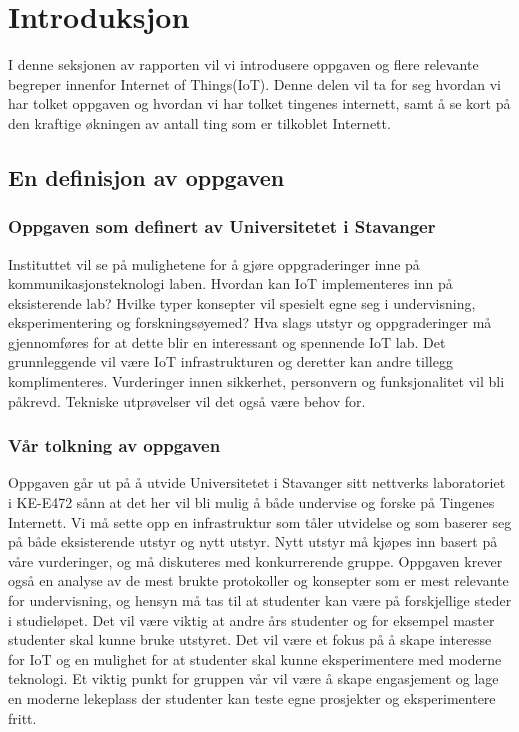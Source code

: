 \documentclass{article}
\begin{document}


\newpage
\section{Introduksjon}

I denne seksjonen av rapporten vil vi introdusere oppgaven og flere relevante begreper innenfor Internet of Things(IoT). Denne delen vil ta for seg hvordan vi har tolket oppgaven og hvordan vi har tolket tingenes internett, samt å se kort på den kraftige økningen av antall ting som er tilkoblet Internett.

\subsection{En definisjon av oppgaven}

\subsubsection{Oppgaven som definert av Universitetet i Stavanger}
Instituttet vil se på mulighetene for å gjøre oppgraderinger inne på kommunikasjonsteknologi laben. Hvordan kan IoT implementeres inn på eksisterende lab? Hvilke typer konsepter vil spesielt egne seg i undervisning, eksperimentering og forskningsøyemed? Hva slags utstyr og oppgraderinger må gjennomføres for at dette blir en interessant og spennende IoT lab. Det grunnleggende vil være IoT infrastrukturen og deretter kan andre tillegg komplimenteres. Vurderinger innen sikkerhet, personvern og funksjonalitet vil bli påkrevd. Tekniske utprøvelser vil det også være behov for.

\subsubsection{Vår tolkning av oppgaven}
Oppgaven går ut på å utvide Universitetet i Stavanger sitt nettverks laboratoriet i KE-E472 sånn at det her vil bli mulig å både undervise og forske på Tingenes Internett. Vi må sette opp en infrastruktur som tåler utvidelse og som baserer seg på  både eksisterende utstyr og nytt utstyr. Nytt utstyr må kjøpes inn basert på våre vurderinger, og må diskuteres med konkurrerende gruppe. Oppgaven krever også en analyse av de mest brukte protokoller og konsepter som er mest relevante for undervisning, og hensyn må tas til at studenter kan være på forskjellige steder i studieløpet. Det vil være viktig at andre års studenter og for eksempel master studenter skal kunne bruke utstyret. Det vil være et fokus på å skape interesse for IoT og en mulighet for at studenter skal kunne eksperimentere med moderne teknologi. Et viktig punkt for gruppen vår vil være å skape engasjement og lage en moderne lekeplass der studenter kan teste egne prosjekter og eksperimentere fritt.
\end{document}
